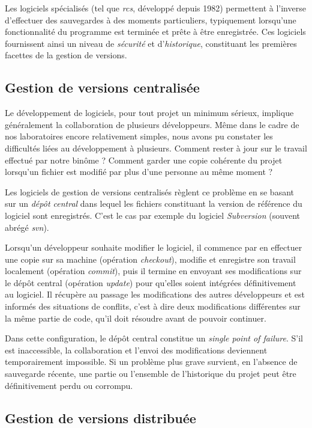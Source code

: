\documentclass[11pt,a4paper]{article}
\begin{document}
Les logiciels spécialisés (tel que \textit{rcs}, développé depuis 1982) permettent à l'inverse d'effectuer des sauvegardes à des moments particuliers, typiquement lorsqu'une fonctionnalité du programme est terminée et prête à être enregistrée.
Ces logiciels fournissent ainsi un niveau de \textit{sécurité} et d'\textit{historique}, constituant les premières facettes de la gestion de versions.

\subsection{Gestion de versions centralisée}

Le développement de logiciels, pour tout projet un minimum sérieux, implique généralement la collaboration de plusieurs développeurs.
Même dans le cadre de nos laboratoires encore relativement simples, nous avons pu constater les difficultés liées au développement à plusieurs.
Comment rester à jour sur le travail effectué par notre binôme ?
Comment garder une copie cohérente du projet lorsqu'un fichier est modifié par plus d'une personne au même moment ?

Les logiciels de gestion de versions centralisés règlent ce problème en se basant sur un \textit{dépôt central} dans lequel les fichiers constituant la version de référence du logiciel sont enregistrés.
C'est le cas par exemple du logiciel \textit{Subversion} (souvent abrégé \textit{svn}).

Lorsqu'un développeur souhaite modifier le logiciel, il commence par en effectuer une copie sur sa machine (opération \textit{checkout}), modifie et enregistre son travail localement (opération \textit{commit}), puis il termine en envoyant ses modifications sur le dépôt central (opération \textit{update}) pour qu'elles soient intégrées définitivement au logiciel.
Il récupère au passage les modifications des autres développeurs et est informés des situations de conflits, c'est à dire deux modifications différentes sur la même partie de code, qu'il doit résoudre avant de pouvoir continuer.

Dans cette configuration, le dépôt central constitue un \textit{single point of failure}.
S'il est inaccessible, la collaboration et l'envoi des modifications deviennent temporairement impossible.
Si un problème plus grave survient, en l'absence de sauvegarde récente, une partie ou l'ensemble de l'historique du projet peut être définitivement perdu ou corrompu.

\subsection{Gestion de versions distribuée}
\end{document}
